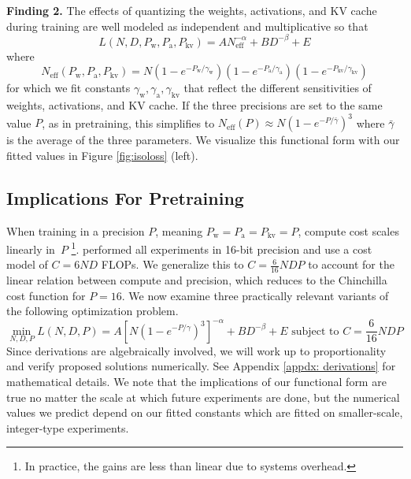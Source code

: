 \documentclass[11pt]{article}
\begin{document}
\begin{tcolorbox}[colback=lightblue!10, colframe=lightblue!50!black, boxrule=0.5mm, arc=2mm]
\label{finding:3}
    \textbf{Finding 2.} The effects of quantizing the weights, activations, and KV cache during training are well modeled as independent and multiplicative so that $$L(N, D, P_\text{w}, P_\text{a}, P_\text{kv}) = 
AN_\text{eff}^{-\alpha} + B D^{-\beta} + E$$ where $$N_\text{eff}(P_\text{w}, P_\text{a}, P_\text{kv}) = N(1-e^{-P_\text{w}/\gamma_\text{w}})(1-e^{-P_\text{a}/\gamma_\text{a}})(1-e^{-P_\text{kv}/\gamma_\text{kv}})$$ for which we fit constants $\gamma_\text{w}, \gamma_\text{a}, \gamma_\text{kv}$ that reflect the different sensitivities of weights, activations, and KV cache. If the three precisions are set to the same value $P$, as in pretraining, this simplifies to $N_\text{eff}(P) \approx N(1-e^{-P/\bar{\gamma}})^3$ where $\bar{\gamma}$ is the average of the three parameters. We visualize this functional form with our fitted values in Figure \ref{fig:isoloss} (left). 
\end{tcolorbox}

\subsection{Implications For Pretraining}
\label{section:implications-pretraining}

When training in a precision $P$, meaning $P_\text{w}=P_\text{a}=P_\text{kv}=P$, compute cost scales linearly in~$P$ \citep{abdelkhalik2022demystifying}\footnote{In practice, the gains are less than linear due to systems overhead.}.
\citet{hoffmann2022training} performed all experiments in 16-bit precision and use a cost model of $C = 6ND$ FLOPs. We generalize this to $C = \frac{6}{16}NDP$ to account for the linear relation between compute and precision, which reduces to the Chinchilla cost function for $P=16$. We now examine three practically relevant variants of the following optimization problem. 
%
\begin{equation}
    \min_{N, D, P} L(N, D, P) = A[N(1-e^{-P/\gamma})^3]^{-\alpha} + BD^{-\beta} + E \text { subject to } C = \frac{6}{16} NDP 
\end{equation}
%
Since derivations are algebraically involved, we will work up to proportionality and verify proposed solutions numerically. See Appendix \ref{appdx: derivations} for mathematical details. We note that the implications of our functional form are true no matter the scale at which future experiments are done, but the numerical values we predict depend on our fitted constants which are fitted on smaller-scale, integer-type experiments. 
\end{document}
